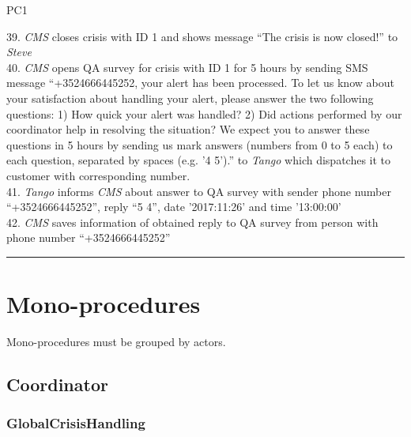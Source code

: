 \begin{lyxlist}{PC1}
{39. \emph{CMS} closes crisis with ID 1 and shows message ``The crisis is now
closed!'' to \emph{Steve}\\
40. \emph{CMS} opens QA survey for crisis with ID 1 for 5 hours by sending SMS
message ``+3524666445252, your alert has been processed. To let us know about
your satisfaction about handling your alert, please answer the two following
questions: 1) How quick your alert was handled? 2) Did actions performed by our
coordinator help in resolving the situation? We expect you to answer these
questions in 5 hours by sending us mark answers (numbers from 0 to 5 each) to
each question, separated by spaces (e.g. '4 5').'' to \emph{Tango} which
dispatches it to customer with corresponding number.\\
41. \emph{Tango} informs \emph{CMS} about answer to QA survey with sender phone
number ``+3524666445252'', reply ``5 4'', date '2017:11:26' and time
'13:00:00'\\
42. \emph{CMS} saves information of obtained reply to QA survey from person
with phone number ``+3524666445252''


}

\end{lyxlist}
\hrule


\section{Mono-procedures}
Mono-procedures must be grouped by actors.

\subsection{Coordinator}

\subsubsection{GlobalCrisisHandling}

